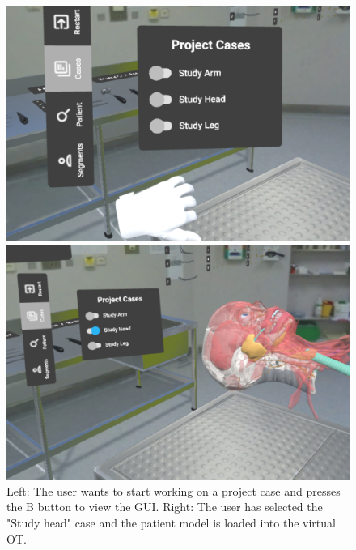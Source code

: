 \begin{figure}[ht]
  \centering
  \begin{minipage}{.5\textwidth}
    \centering
    \includegraphics[width=0.99\linewidth]{images/implementation/user_interface/project_case_pre_load.png}
  \end{minipage}%
  \begin{minipage}{.5\textwidth}
    \centering
    \includegraphics[width=0.99\linewidth]{images/implementation/user_interface/project_case_loaded.png}
  \end{minipage}
  \caption{\label{fig::LoadingProjectCase} Left: The user wants to start working on a project case and presses the B button to view the GUI. Right: The user has selected the "Study head" case and the patient model is loaded into the virtual OT.}
\end{figure}

